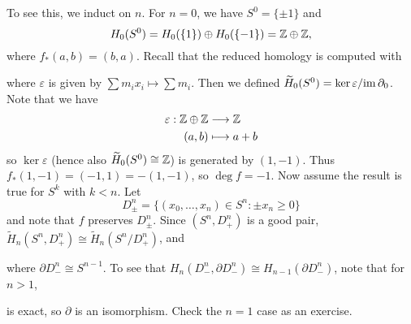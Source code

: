 \begin{remark}
\begin{enumerate}
      To see this, we induct on $n$. For
      $n = 0$, we have $S^0 = \{\pm 1\}$ and
      \[
        H_0(S^0) = H_0(\{1\}) \oplus H_0(\{-1\}) = \mathbb{Z} \oplus \mathbb{Z},
      \]
      where $f_*(a, b) = (b, a)$. Recall that the
      reduced homology is computed with
      \begin{center}
      \end{center}
      where $\varepsilon$ is given by
      $\sum m_i x_i \mapsto \sum m_i$. Then we
      defined $\widetilde{H}_0(S^0) = \ker \varepsilon / {\operatorname{im} \partial_0}$.
      Note that we have
      \begin{align*}
        \varepsilon : \mathbb{Z} \oplus \mathbb{Z} &\longrightarrow \mathbb{Z} \\
        (a, b) &\longmapsto a + b
      \end{align*}
      so $\ker \varepsilon$ (hence also
      $\widetilde{H}_0(S^0) \cong \mathbb{Z}$) is generated by
      $(1, -1)$. Thus
      $f_*(1, -1) = (-1, 1) = -(1, -1)$, so
      $\deg f = -1$. Now assume the
      result is true for $S^k$ with $k < n$. Let
      \[
        D^n_{\pm} = \{(x_0, \dots, x_n) \in S^n : \pm x_n \ge 0\}
      \]
      and note that $f$ preserves $D^n_{\pm}$.
      Since $(S^n, D^n_+)$ is a good pair,
      $\widetilde{H}_n(S^n, D^n_+) \cong \widetilde{H}_n(S^n / D^n_+)$,
      and
      \begin{center}
      \end{center}
      where $\partial D^n_- \cong S^{n - 1}$.
      To see that $H_n(D^n_-, \partial D^n_-) \cong H_{n - 1}(\partial D^n_-)$, note that for $n > 1$,
      \begin{center}
      \end{center}
      is exact, so $\partial$ is an isomorphism.
      Check the $n = 1$ case as an exercise.


\end{enumerate}
\end{remark}
